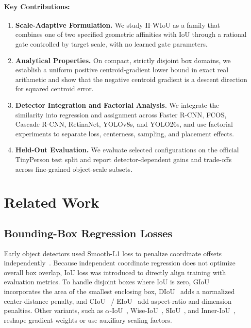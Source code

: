 \documentclass[11pt,a4paper]{article}
\begin{document}
\paragraph{Key Contributions:}
\begin{enumerate}
  \item \textbf{Scale-Adaptive Formulation.} We study H-WIoU as a family that combines one of two specified geometric affinities with IoU through a rational gate controlled by target scale, with no learned gate parameters.
  \item \textbf{Analytical Properties.} On compact, strictly disjoint box domains, we establish a uniform positive centroid-gradient lower bound in exact real arithmetic and show that the negative centroid gradient is a descent direction for squared centroid error.
  \item \textbf{Detector Integration and Factorial Analysis.} We integrate the similarity into regression and assignment across Faster R-CNN, FCOS, Cascade R-CNN, RetinaNet, YOLOv8s, and YOLO26s, and use factorial experiments to separate loss, centerness, sampling, and placement effects.
  \item \textbf{Held-Out Evaluation.} We evaluate selected configurations on the official TinyPerson test split and report detector-dependent gains and trade-offs across fine-grained object-scale subsets.
\end{enumerate}


\section{Related Work}

\subsection{Bounding-Box Regression Losses}
Early object detectors used Smooth-L1 loss to penalize coordinate offsets independently~\cite{girshick2015fast}. Because independent coordinate regression does not optimize overall box overlap, IoU loss was introduced to directly align training with evaluation metrics. To handle disjoint boxes where IoU is zero, GIoU~\cite{rezatofighi2019generalized} incorporates the area of the smallest enclosing box, DIoU~\cite{zheng2020distance} adds a normalized center-distance penalty, and CIoU~\cite{zheng2020distance} / EIoU~\cite{zhang2022eiou} add aspect-ratio and dimension penalties. Other variants, such as $\alpha$-IoU~\cite{he2021alphaiou}, Wise-IoU~\cite{tong2023wiou}, SIoU~\cite{ghevondean2022siou}, and Inner-IoU~\cite{zhang2023inneriou}, reshape gradient weights or use auxiliary scaling factors.
\end{document}
